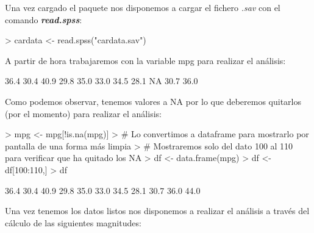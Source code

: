 \documentclass [a4paper] {article}
\begin{document}
Una vez cargado el paquete nos disponemos a cargar el fichero \textit{.sav} con el comando \textbf{\textit{read.spss}}:
\begin{Schunk}
\begin{Sinput}
> cardata <- read.spss("cardata.sav")
\end{Sinput}
\end{Schunk}

A partir de hora trabajaremos con la variable mpg para realizar el análisis:
\begin{Schunk}
\begin{Soutput}
 [1] 36.4 30.4 40.9 29.8 35.0 33.0 34.5 28.1   NA 30.7 36.0
\end{Soutput}
\end{Schunk}
\newpage
Como podemos observar, tenemos valores a NA por lo que deberemos quitarlos (por el momento) para realizar el análisis:
\begin{Schunk}
\begin{Sinput}
> mpg <- mpg[!is.na(mpg)]
> # Lo convertimos a dataframe para mostrarlo por pantalla de una forma más limpia
> # Mostraremos solo del dato 100 al 110 para verificar que ha quitado los NA
> df <- data.frame(mpg)
> df <- df[100:110,]
> df
\end{Sinput}
\begin{Soutput}
 [1] 36.4 30.4 40.9 29.8 35.0 33.0 34.5 28.1 30.7 36.0 44.0
\end{Soutput}
\end{Schunk}

Una vez tenemos los datos listos nos disponemos a realizar el análisis a través del cálculo de las siguientes magnitudes:
\end{document}
